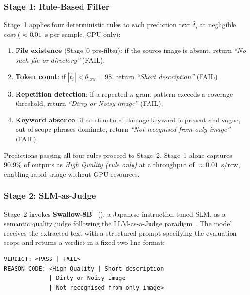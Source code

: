 \documentclass[twocolumn]{article}
\begin{document}
\subsubsection{Stage 1: Rule-Based Filter}
\label{sec:guard_stage1}

Stage~1 applies four deterministic rules to each prediction text $\hat{t}_i$
at negligible cost (${\approx}0.01$~s per sample, CPU-only):

\begin{enumerate}[leftmargin=*,itemsep=1pt]
  \item \textbf{File existence} (Stage~0 pre-filter): if the source image is
        absent, return \textit{``No such file or directory''} (FAIL).
  \item \textbf{Token count}: if $|\hat{t}_i| < \theta_{\text{low}} = 98$,
        return \textit{``Short description''} (FAIL).
  \item \textbf{Repetition detection}: if a repeated $n$-gram pattern exceeds
        a coverage threshold, return \textit{``Dirty or Noisy image''} (FAIL).
  \item \textbf{Keyword absence}: if no structural damage keyword is present
        and vague, out-of-scope phrases dominate, return
        \textit{``Not recognised from only image''} (FAIL).
\end{enumerate}

Predictions passing all four rules proceed to Stage~2.
Stage~1 alone captures 90.9\% of outputs as \textit{High Quality (rule only)}
at a throughput of ${\approx}0.01$~s/row, enabling rapid triage without GPU
resources.

\subsubsection{Stage 2: SLM-as-Judge}
\label{sec:guard_stage2}

Stage~2 invokes \textbf{Swallow-8B}~\cite{tokyotech2024swallow}
(),
a Japanese instruction-tuned SLM, as a semantic quality judge following
the LLM-as-a-Judge paradigm~\cite{zheng2023judge}.
The model receives the extracted text with a structured prompt specifying
the evaluation scope and returns a verdict in a fixed two-line format:

\begin{small}
\begin{verbatim}
VERDICT: <PASS | FAIL>
REASON_CODE: <High Quality | Short description
             | Dirty or Noisy image
             | Not recognised from only image>
\end{verbatim}
\end{small}
\end{document}

